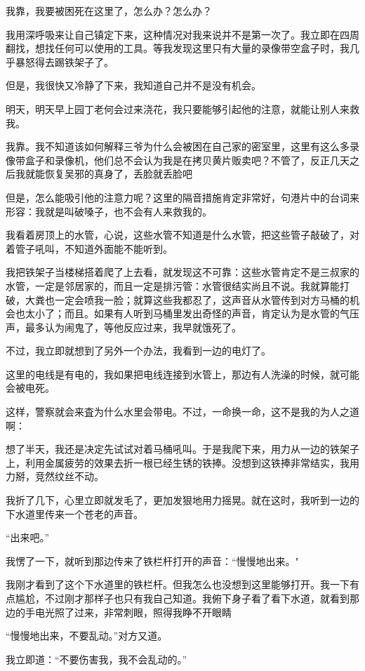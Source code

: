 我靠，我要被困死在这里了，怎么办？怎么办？

我用深呼吸来让自己镇定下来，这种情况对我来说并不是第一次了。我立即在四周翻找，想找任何可以使用的工具。等我发现这里只有大量的录像带空盒子时，我几乎暴怒得去踢铁架子了。

但是，我很快又冷静了下来，我知道自己并不是没有机会。

明天，明天早上园丁老何会过来浇花，我只要能够引起他的注意，就能让别人来救我。

我靠。我不知道该如何解释三爷为什么会被困在自己家的密室里，这里有这么多录像带盒子和录像机，他们总不会认为我是在拷贝黄片贩卖吧？不管了，反正几天之后我就能恢复吴邪的真身了，丢脸就丢脸吧

但是，怎么能吸引他的注意力呢？这里的隔音措施肯定非常好，句港片中的台词来形容：我就是叫破嗓子，也不会有人来救我的。

我看着房顶上的水管，心说，这些水管不知道是什么水管，把这些管子敲破了，对着管子吼叫，不知道外面能不能听到。

我把铁架子当楼梯搭着爬了上去看，就发现这不可靠：这些水管肯定不是三叔家的水管，一定是邻居家的，而且一定是排污管：水管很结实尚且不说。我就算能打破，大粪也一定会喷我一脸；就算这些我都忍了，这声音从水管传到对方马桶的机会也太小了；而且。如果有人听到马桶里发出奇怪的声音，肯定认为是水管的气压声，最多认为闹鬼了，等他反应过来，我早就饿死了。

不过，我立即就想到了另外一个办法，我看到一边的电灯了。

这里的电线是有电的，我如果把电线连接到水管上，那边有人洗澡的时候，就可能会被电死。

这样，警察就会来査为什么水里会带电。不过，一命换一命，这不是我的为人之道啊：

想了半天，我还是决定先试试对着马桶吼叫。于是我爬下来，用力从一边的铁架子上，利用金属疲劳的效果去折一根已经生锈的铁捧。没想到这铁捧非常结实，我用力掰，竞然纹丝不动。

我折了几下，心里立即就发毛了，更加发狠地用力摇晃。就在这时，我听到一边的下水道里传来一个苍老的声音。

“出来吧。”

我愣了一下，就听到那边传来了铁栏杆打开的声音：“慢慢地出来。"

我刚才看到了这个下水道里的铁栏杆。但我怎么也没想到这里能够打开。我一下有点尴尬，不过刚才那样子也只有我自己知道。我俯下身子看了看下水道，就看到那边的手电光照了过来，非常刺眼，照得我睁不开眼睛

“慢慢地出来，不要乱动。”对方又道。

我立即道：“不要伤害我，我不会乱动的。”

